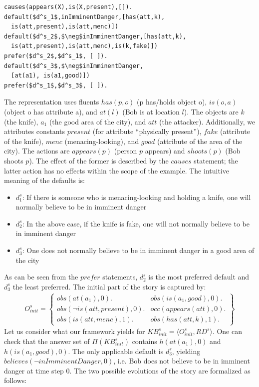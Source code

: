 \documentclass{article}
\begin{document}
\begin{lstlisting}[language=clingo,caption=Set $RD^s$ of statements for the self-defense example, label=lst:pi_S, mathescape=true,xleftmargin=.01\textwidth, breaklines=true]
causes(appears(X),is(X,present),[]).
default($d^s_1$,inImminentDanger,[has(att,k),
  is(att,present),is(att,menc)])
default($d^s_2$,$\neg$inImminentDanger,[has(att,k),
  is(att,present),is(att,menc),is(k,fake)])
prefer($d^s_2$,$d^s_1$, [ ]).
default($d^s_3$,$\neg$inImminentDanger,
  [at(a1), is(a1,good)])
prefer($d^s_1$,$d^s_3$, [ ]).
\end{lstlisting}
The representation uses fluents $has(p,o)$ (p has/holds object o), $is(o,a)$ (object o has attribute a), and $at(l)$ (Bob is at location $l$). The objects are $k$ (the knife), $a_1$ (the good area of the city), and $att$ (the attacker). Additionally, we attributes constants $present$ (for attribute ``physically present''), $fake$ (attribute of the knife), $menc$ (menacing-looking), and $good$ (attribute of the area of the city). The actions are $appears(p)$ (person $p$ appears) and $shoots(p)$ (Bob shoots $p$). The effect of the former is described by the $causes$ statement; the latter action has no effects within the scope of the example. The intuitive meaning of the defaults is:
\begin{itemize}
\item $d^s_1$: If there is someone who is menacing-looking and holding a knife, one will normally believe to be in imminent danger
\item $d^s_2$: In the above case, if the knife is fake, one will not normally believe to be in imminent danger
\item $d^s_3$: One does not normally believe to be in imminent danger in a good area of the city
\end{itemize} 
As can be seen from the $prefer$ statements, $d^s_2$ is the most preferred default and $d^s_3$ the least preferred.
The initial part of the story is captured by:
\[
\begin{array}{lll}
O^s_{init}  =  \left\{
\begin{array}{ll} 
obs(at(a_1),0).   %
& obs(is(a_1,good),0). \\
obs(\neg is(att,present),0). & 
occ(appears(att),0). \\    %
obs(is(att,menc),1). &  %
obs(has(att,k),1).
\end{array}
\right\}
\end{array}
\]
Let us consider what our framework yields for $KB^s_{init}=\langle O^s_{init},RD^s \rangle$. One can check that the answer set of $\Pi(KB^s_{init})$ contains $h(at(a_1),0)$ and $h(is(a_1,good),0)$. The only applicable default is $d^s_3$, yielding $believes(\neg inImminentDanger,0)$, i.e. Bob does not believe to be in imminent danger at time step $0$. The two possible evolutions of the story are formalized as follows:
\end{document}
